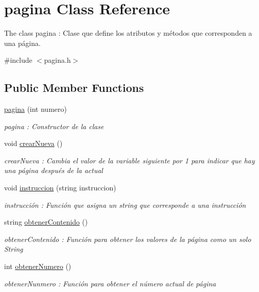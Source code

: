 \hypertarget{classpagina}{}\section{pagina Class Reference}
\label{classpagina}


The class pagina \+: Clase que define los atributos y métodos que corresponden a una página.  




{\ttfamily \#include $<$pagina.\+h$>$}

\subsection*{Public Member Functions}
\begin{DoxyCompactItemize}
\item 
\hyperlink{classpagina_af157a661e62b62ce048b58cb3fc25dc6}{pagina} (int numero)
\begin{DoxyCompactList}\small\item\em pagina \+: Constructor de la clase \end{DoxyCompactList}\item 
void \hyperlink{classpagina_a754ce18f54f4d73fcf4440c7a16f3359}{crear\+Nueva} ()\hypertarget{classpagina_a754ce18f54f4d73fcf4440c7a16f3359}{}\label{classpagina_a754ce18f54f4d73fcf4440c7a16f3359}

\begin{DoxyCompactList}\small\item\em crear\+Nueva \+: Cambia el valor de la variable siguiente por 1 para indicar que hay una página después de la actual \end{DoxyCompactList}\item 
void \hyperlink{classpagina_a7e735f5833b86bc6ab4c8b777efe9e2a}{instruccion} (string instruccion)
\begin{DoxyCompactList}\small\item\em instrucción \+: Función que asigna un string que corresponde a una instrucción \end{DoxyCompactList}\item 
string \hyperlink{classpagina_a1f53b71a3ba714249064b0de25c81149}{obtener\+Contenido} ()
\begin{DoxyCompactList}\small\item\em obtener\+Contenido \+: Función para obtener los valores de la página como un solo String \end{DoxyCompactList}\item 
int \hyperlink{classpagina_a20241a4d6dfa1ebddfbdb15395bd5e75}{obtener\+Numero} ()
\begin{DoxyCompactList}\small\item\em obtener\+Nunmero \+: Función para obtener el número actual de página \end{DoxyCompactList}\end{DoxyCompactItemize}


